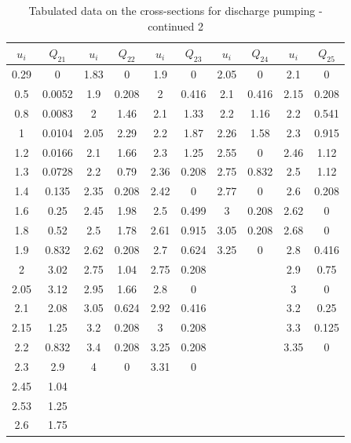 \documentclass{report}
\begin{document}
\begin{table}
\centering
\small
\caption{Tabulated data on the cross-sections for discharge pumping - continued 2}
\begin{tabular}{|c|c||c|c||c|c||c|c||c|c|}
\hline 
$u_i$ & $Q_{21}$ & $u_i$ & $Q_{22}$ & $u_i$ & $Q_{23}$ & $u_i$ & $Q_{24}$ & $u_i$ & $Q_{25}$ \\
\hline 
0.29 & 0      & 1.83  & 0     & 1.9  & 0     & 2.05 & 0     & 2.1  & 0     \\
0.5  & 0.0052 & 1.9   & 0.208 & 2    & 0.416 & 2.1  & 0.416 & 2.15 & 0.208 \\
0.8  & 0.0083 & 2     & 1.46  & 2.1  & 1.33  & 2.2  & 1.16  & 2.2  & 0.541 \\
1    & 0.0104 & 2.05  & 2.29  & 2.2  & 1.87  & 2.26 & 1.58  & 2.3  & 0.915 \\
1.2  & 0.0166 & 2.1   & 1.66  & 2.3  & 1.25  & 2.55 & 0     & 2.46 & 1.12  \\
1.3  & 0.0728 & 2.2   & 0.79  & 2.36 & 0.208 & 2.75 & 0.832 & 2.5  & 1.12  \\
1.4  & 0.135  & 2.35  & 0.208 & 2.42 & 0     & 2.77 & 0     & 2.6  & 0.208 \\
1.6  & 0.25   & 2.45  & 1.98  & 2.5  & 0.499 & 3    & 0.208 & 2.62 & 0     \\
1.8  & 0.52   & 2.5   & 1.78  & 2.61 & 0.915 & 3.05 & 0.208 & 2.68 & 0     \\
1.9  & 0.832  & 2.62  & 0.208 & 2.7  & 0.624 & 3.25 & 0     & 2.8  & 0.416 \\
2    & 3.02   & 2.75  & 1.04  & 2.75 & 0.208 &      &       & 2.9  & 0.75  \\
2.05 & 3.12   & 2.95  & 1.66  & 2.8  & 0     &      &       & 3    & 0     \\
2.1  & 2.08   & 3.05  & 0.624 & 2.92 & 0.416 &      &       & 3.2  & 0.25  \\
2.15 & 1.25   & 3.2   & 0.208 & 3    & 0.208 &      &       & 3.3  & 0.125 \\
2.2  & 0.832  & 3.4   & 0.208 & 3.25 & 0.208 &      &       & 3.35 & 0     \\
2.3  & 2.9    & 4     & 0     & 3.31 & 0     &      &       &      &       \\
2.45 & 1.04   &       &       &      &       &      &       &      &       \\
2.53 & 1.25   &       &       &      &       &      &       &      &       \\ 
2.6  & 1.75   &       &       &      &       &      &       &      &       \\ 

\end{tabular}
\end{table}
\end{document}
